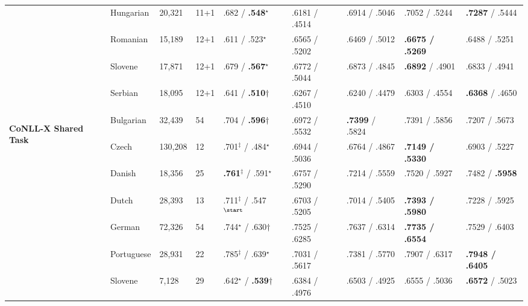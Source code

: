 \begin{table}[h]
\begin{flushleft}
\begin{tabular}{|@{ }l@{ }|@{ }l@{ }|@{ }l@{ }|@{ }l@{ }|@{ }l@{ }|@{ }l@{ }|@{ }l@{ }|@{ }l@{ }|@{ }l@{ }|}
        & Hungarian  & 20,321  & 11+1 & .682 / \textbf{.548}$^\star$    & .6181 / .4514 & .6914 / .5046 & .7052 / .5244     & \textbf{.7287} / .5444 \\
        & Romanian   & 15,189  & 12+1 & .611 / .523$^\star$    & .6565 / .5202 & .6469 / .5012 & \textbf{.6675 / .5269}     & .6488 / .5251 \\
        & Slovene    & 17,871  & 12+1 & .679 / \textbf{.567}$^\star$    & .6772 / .5044 & .6873 / .4845 & \textbf{.6892} / .4901     & .6833 / .4941 \\
        & Serbian    & 18,095  & 12+1 & .641 / \textbf{.510}$\dagger$        & .6267 / .4510 & .6240 / .4479 & .6303 / .4554     & \textbf{.6368} / .4650 \\
        \hline %
        \multirow{10}{*}{\begin{sideways}\textbf{CoNLL-X Shared Task}\end{sideways}}
        & Bulgarian  & 32,439  & 54   & .704 / \textbf{.596}$\dagger$        & .6972 / .5532 & \textbf{.7399} / .5824  & .7391 / .5856     & .7207 / .5673 \\
        & Czech      & 130,208 & 12   & .701$^\ddagger$ / .484$^\star$           & .6944 / .5036 & .6764 / .4867  & \textbf{.7149 / .5330}     & .6903 / .5227 \\
        & Danish     & 18,356  & 25   & \textbf{.761}$^\ddagger$ / .591$^\star$           & .6757 / .5290 & .7214 / .5559  & .7520 / .5927     & .7482 / \textbf{.5958} \\
        & Dutch      & 28,393  & 13   & .711$^\ddagger$ / .547$^\start$ & .6703 / .5205 & .7014 / .5405  & \textbf{.7393 / .5980}     & .7228 / .5925 \\
        & German     & 72,326  & 54   & .744$^\star$ / .630$\dagger$& .7525 / .6285 & .7637 / .6314  & \textbf{.7735 / .6554}     & .7529 / .6403 \\
        & Portuguese & 28,931  & 22   & .785$^\ddagger$ / .639$^\star$           & .7031 / .5617 & .7381 / .5770  & .7907 / .6317     & \textbf{.7948 / .6405} \\
        & Slovene    & 7,128   & 29   & .642$^\star$ / \textbf{.539}$\dagger$    & .6384 / .4976 & .6503 / .4925  & .6555 / .5036     & \textbf{.6572} / .5023 \\

\end{tabular}
\end{flushleft}
\end{table}

